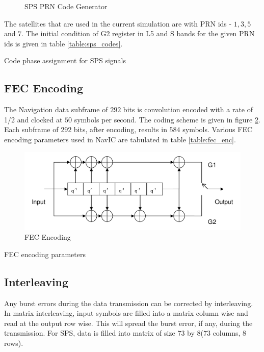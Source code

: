 \begin{figure}[!ht]
	\centering
	
	\caption{SPS PRN Code Generator}
	\label{figure:codeGen}
\end{figure}

\noindent The satellites that are used in the current simulation are with PRN ids - $1,3,5$ and $7$. The initial condition of G2 register in L5 and S bands for the given PRN ids is given in table \ref{table:sps_codes}.

\begin{table}[h]

\vspace{3mm}
\caption{Code phase assignment for SPS signals}
\label{table:sps_codes}
\end{table}

\newpage
\subsection{FEC Encoding}
The Navigation data subframe of $292$ bits is convolution encoded with a rate of 1/2 and clocked at $50$ symbols per second. The coding scheme is given in figure \ref{fig:FEC}. Each subframe of $292$ bits, after encoding, results in $584$ symbols. Various FEC encoding parameters used in NavIC are tabulated in table \ref{table:fec_enc}.
\begin{figure}[ht]
\centering
\includegraphics[width=\columnwidth]{figs/FEC.png}
\centering
\captionsetup{justification=centering}
\caption{FEC Encoding}
\label{fig:FEC}
\end{figure}
\newpage
\begin{table}[h]

\vspace{3mm}
\caption{FEC encoding parameters}
\label{table:fec_enc}
\end{table}
\subsection{Interleaving}
Any burst errors during the data transmission can be corrected by interleaving. In matrix interleaving, input symbols are filled into a matrix column wise and read at the output row wise. This will spread the burst error, if any, during the transmission. For SPS, data is filled into matrix of size $73$ by $8$($73$ columns, $8$ rows).

